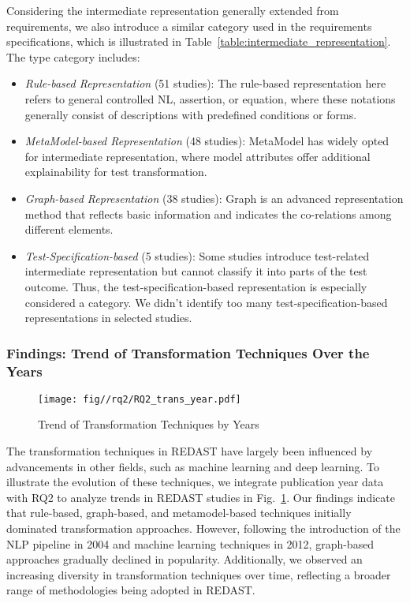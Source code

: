  Considering the intermediate representation generally extended from requirements, we also introduce a similar category used in the requirements specifications, which is illustrated in Table~\ref{table:intermediate_representation}. The type category includes:
\begin{itemize}
    \item \emph{Rule-based Representation} (51 studies): The rule-based representation here refers to general controlled NL, assertion, or equation, where these notations generally consist of descriptions with predefined conditions or forms.
    \item \emph{MetaModel-based Representation} (48 studies): MetaModel has widely opted for intermediate representation, where model attributes offer additional explainability for test transformation.
    
    \item \emph{Graph-based Representation} (38 studies): Graph is an advanced representation method that reflects basic information and indicates the co-relations among different elements.
    \item \emph{Test-Specification-based} (5 studies): Some studies introduce test-related intermediate representation but cannot classify it into parts of the test outcome. Thus, the test-specification-based representation is especially considered a category. We didn't identify too many test-specification-based representations in selected studies. 
\end{itemize}

\subsubsection{Findings: Trend of Transformation Techniques Over the Years}
\begin{figure}
    \centering
    \texttt{[image: fig//rq2/RQ2\_trans\_year.pdf]}
    \caption{Trend of Transformation Techniques by Years}
    \label{fig:tec_trend}
\end{figure}
The transformation techniques in REDAST have largely been influenced by advancements in other fields, such as machine learning and deep learning. To illustrate the evolution of these techniques, we integrate publication year data with RQ2 to analyze trends in REDAST studies in Fig.~\ref{fig:tec_trend}. Our findings indicate that rule-based, graph-based, and metamodel-based techniques initially dominated transformation approaches. However, following the introduction of the NLP pipeline in 2004 and machine learning techniques in 2012, graph-based approaches gradually declined in popularity. Additionally, we observed an increasing diversity in transformation techniques over time, reflecting a broader range of methodologies being adopted in REDAST.

